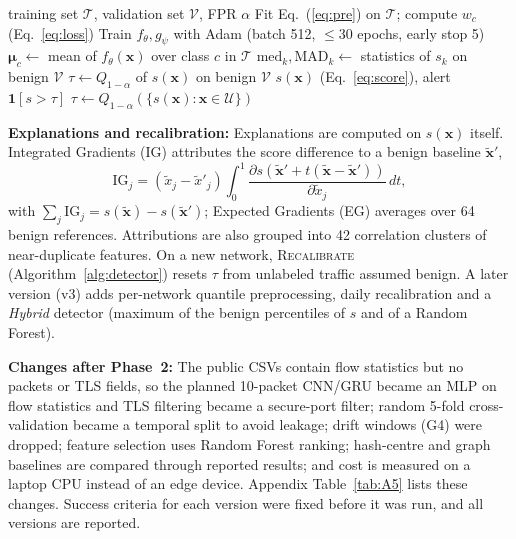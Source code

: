 \documentclass[pdflatex,sn-mathphys-num,iicol]{sn-jnl}%
\begin{document}
\begin{algorithm}[t]
\caption{Training, scoring and recalibration}\label{alg:detector}
\footnotesize
\begin{algorithmic}[1]
\Require training set $\mathcal{T}$, validation set $\mathcal{V}$, FPR $\alpha$
\State Fit Eq.~(\ref{eq:pre}) on $\mathcal{T}$; compute $w_c$ (Eq.~\ref{eq:loss})
\State Train $f_\theta,g_\psi$ with Adam (batch 512, $\le$30 epochs, early stop 5)
\State $\boldsymbol{\mu}_c\gets$ mean of $f_\theta(\mathbf{x})$ over class $c$ in $\mathcal{T}$
\State $\mathrm{med}_k,\mathrm{MAD}_k\gets$ statistics of $s_k$ on benign $\mathcal{V}$
\State $\tau\gets Q_{1-\alpha}$ of $s(\mathbf{x})$ on benign $\mathcal{V}$ 
 \Return $s(\mathbf{x})$ (Eq.~\ref{eq:score}), alert $\mathbf{1}[s>\tau]$ \EndFunction
{}
  \State $\tau\gets Q_{1-\alpha}(\{s(\mathbf{x}):\mathbf{x}\in\mathcal{U}\})$ 
\EndFunction
\end{algorithmic}
\end{algorithm}

\textbf{Explanations and recalibration:} Explanations are computed on $s(\mathbf{x})$ itself. Integrated Gradients (IG) \cite{sundararajan2017ig} attributes the score difference to a benign baseline $\tilde{\mathbf{x}}'$,
\begin{equation}
\mathrm{IG}_j=(\tilde{x}_j-\tilde{x}'_j)\int_{0}^{1}\frac{\partial s(\tilde{\mathbf{x}}'+t(\tilde{\mathbf{x}}-\tilde{\mathbf{x}}'))}{\partial \tilde{x}_j}\,dt,\label{eq:ig}
\end{equation}
with $\sum_j\mathrm{IG}_j=s(\tilde{\mathbf{x}})-s(\tilde{\mathbf{x}}')$; Expected Gradients (EG) \cite{erion2021eg} averages over 64 benign references. Attributions are also grouped into 42 correlation clusters of near-duplicate features. On a new network, \textsc{Recalibrate} (Algorithm~\ref{alg:detector}) resets $\tau$ from unlabeled traffic assumed benign. A later version (v3) adds per-network quantile preprocessing, daily recalibration and a \emph{Hybrid} detector (maximum of the benign percentiles of $s$ and of a Random Forest).

\textbf{Changes after Phase~2:} The public CSVs contain flow statistics but no packets or TLS fields, so the planned 10-packet CNN/GRU became an MLP on flow statistics and TLS filtering became a secure-port filter; random 5-fold cross-validation became a temporal split to avoid leakage; drift windows (G4) were dropped; feature selection uses Random Forest ranking; hash-centre and graph baselines are compared through reported results; and cost is measured on a laptop CPU instead of an edge device. Appendix Table~\ref{tab:A5} lists these changes. Success criteria for each version were fixed before it was run, and all versions are reported.
\end{document}
